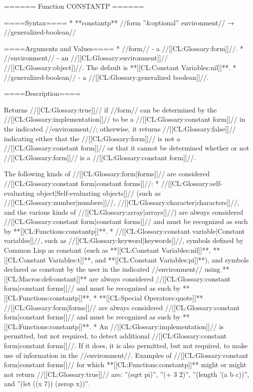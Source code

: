 ====== Function CONSTANTP ======

====Syntax====
  * **constantp** //form ''&optional'' environment// → //generalized-boolean//

====Arguments and Values====
  * //form// - a //[[CL:Glossary:form]]//.
  * //environment// - an //[[CL:Glossary:environment]]// //[[CL:Glossary:object]]//. The default is **[[CL:Constant Variables:nil]]**.
  * //generalized-boolean// - a //[[CL:Glossary:generalized boolean]]//.

====Description====

Returns //[[CL:Glossary:true]]// if //form// can be determined by the //[[CL:Glossary:implementation]]// to be a //[[CL:Glossary:constant form]]// in the indicated //environment//; otherwise, it returns //[[CL:Glossary:false]]// indicating either that the //[[CL:Glossary:form]]// is not a //[[CL:Glossary:constant form]]// or that it cannot be determined whether or not //[[CL:Glossary:form]]// is a //[[CL:Glossary:constant form]]//.

The following kinds of //[[CL:Glossary:form|forms]]// are considered //[[CL:Glossary:constant form|constant forms]]//:
  * //[[CL:Glossary:self-evaluating object|Self-evaluating objects]]// (such as //[[CL:Glossary:number|numbers]]//, //[[CL:Glossary:character|characters]]//, and the various kinds of //[[CL:Glossary:array|arrays]]//) are always considered //[[CL:Glossary:constant form|constant forms]]// and must be recognized as such by **[[CL:Functions:constantp]]**.
  * //[[CL:Glossary:constant variable|Constant variables]]//, such as //[[CL:Glossary:keyword|keywords]]//, symbols defined by Common Lisp as constant (such as **[[CL:Constant Variables:nil]]**, **[[CL:Constant Variables:t]]**, and **[[CL:Constant Variables:pi]]**), and symbols declared as constant by the user in the indicated //environment// using **[[CL:Macros:defconstant]]** are always considered //[[CL:Glossary:constant form|constant forms]]// and must be recognized as such by **[[CL:Functions:constantp]]**.
  * **[[CL:Special Operators:quote]]** //[[CL:Glossary:form|forms]]// are always considered //[[CL:Glossary:constant form|constant forms]]// and must be recognized as such by **[[CL:Functions:constantp]]**.
  * An //[[CL:Glossary:implementation]]// is permitted, but not required, to detect additional //[[CL:Glossary:constant form|constant forms]]//. If it does, it is also permitted, but not required, to make use of information in the //environment//. Examples of //[[CL:Glossary:constant form|constant forms]]// for which **[[CL:Functions:constantp]]** might or might not return //[[CL:Glossary:true]]// are: ''(sqrt pi)'', ''(+ 3 2)'', ''(length '(a b c))'', and ''(let ((x 7)) (zerop x))''.

